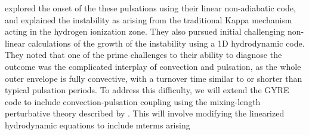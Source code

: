\citet{1997AampA...327..224H} explored the onset of the these pulsations using
their linear non-adiabatic code, and explained the instability 
as arising from the traditional Kappa mechanism acting in the
hydrogen ionization zone. They also pursued initial challenging
non-linear calculations of the growth of the instability using a 1D 
hydrodynamic code. They noted that one of the prime challenges to
their ability to diagnose the outcome was the complicated interplay of
convection and pulsation, as the whole outer envelope is fully
convective, with a turnover time similar to or shorter than typical pulsation periods. To address this difficulty, we will extend the GYRE code to include convection-pulsation coupling using the mixing-length perturbative theory described by \citet{Grigahcene:2005}. This will involve modifying the linearized hydrodynamic equations to include mterms arising 
